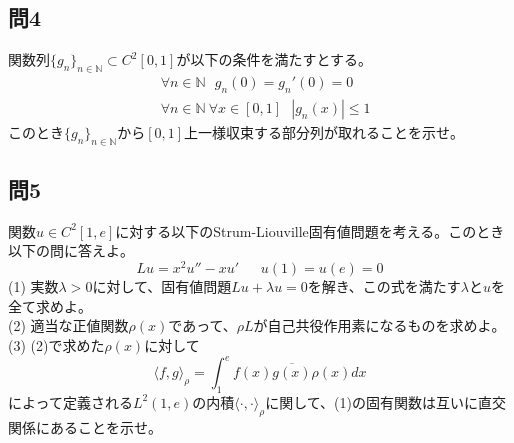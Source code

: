 \documentclass{jsarticle}
\begin{document}
\subsection*{問4}
関数列$\{g_n\}_{n\in \mathbb{N}} \subset C^2[0,1]$が以下の条件を満たすとする。
\begin{align*}
  &\forall n \in \mathbb{N} \ \ \ g_n(0)=g_n'(0)=0 \\
  &\forall n \in \mathbb{N} \ \forall x \in [0,1] \ \ \ |g_n(x)| \leq 1
\end{align*}
このとき$\{ g_n \}_{n \in \mathbb{N}}$から$[0,1]$上一様収束する部分列が取れることを示せ。

\subsection*{問5}
関数$u \in C^2[1,e]$に対する以下のStrum-Liouville固有値問題を考える。このとき以下の問に答えよ。
$$
Lu = x^2 u'' -xu' \ \ \ \ \ \ \ u(1)=u(e)=0
$$
(1) 実数$\lambda > 0$に対して、固有値問題$Lu+\lambda u=0$を解き、この式を満たす$\lambda$と$u$を全て求めよ。\\
(2) 適当な正値関数$\rho(x)$であって、$\rho L$が自己共役作用素になるものを求めよ。\\
(3) (2)で求めた$\rho(x)$に対して
$$
\langle f,g \rangle_{\rho} = \int_1^e f(x)\overline{g(x)}\rho(x)dx
$$
によって定義される$L^2(1,e)$の内積$\langle \cdot, \cdot \rangle_{\rho}$に関して、(1)の固有関数は互いに直交関係にあることを示せ。

\newpage
\end{document}

